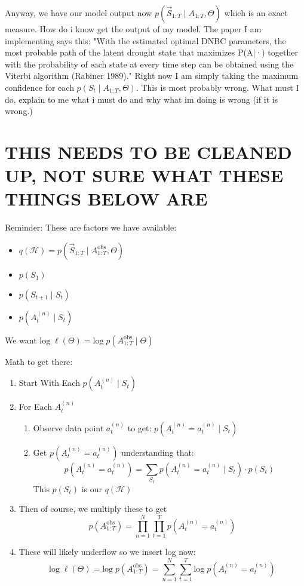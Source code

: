 Anyway, we have our model output now $p(\vec{S}_{1:T} \mid A_{1:T}, \Theta)$ which is an exact measure. How do i know get the output of my model. The paper I am implementing says this: "With the estimated optimal DNBC parameters, the most probable path of the latent drought state that maximizes P(A|·) together with the probability of each state at every time step can be obtained using the Viterbi algorithm (Rabiner 1989)." Right now I am simply taking the maximum confidence for each $p(S_t \mid A_{1:T}, \Theta)$. This is most probably wrong. What must I do, explain to me what i must do and why what im doing is wrong (if it is wrong.)








\newpage
\section{THIS NEEDS TO BE CLEANED UP, NOT SURE WHAT THESE THINGS BELOW ARE}


Reminder: These are factors we have available:
\begin{itemize}
\item $q(\mathcal{H}) = p(\vec{S}_{1:T} \mid A_{1:T}^{\text{obs}}, \Theta)$
\item $p(S_1)$
\item $p(S_{t+1} \mid S_t)$
\item $p(A^{(n)}_t \mid S_t)$
\end{itemize}

We want $\text{log} \; \ell(\Theta) = \text{log} \; p(A_{1:T}^{\text{obs}} \mid \Theta)$

Math to get there:
\begin{enumerate}
    \item Start With Each $p(A_t^{(n)} \mid S_t)$
    \item For Each $A_t^{(n)}$
        \begin{enumerate}
            \item Observe data point $a_t^{(n)}$ to get: $p(A_t^{(n)} = a^{(n)}_t \mid S_t)$
            \item Get $p(A_t^{(n)} = a^{(n)}_t)$ understanding that: 
                \[
p(A_t^{(n)} = a^{(n)}_t) = \sum\limits_{S_t} p(A_t^{(n)} = a^{(n)}_t \mid S_t) \cdot p(S_t)
                \]
                This $p(S_t)$ is our $q(\mathcal{H})$
        \end{enumerate}
    \item Then of course, we multiply these to get 
        \[
p(A_{1:T}^\text{obs}) = \prod\limits_{n=1}^N\prod\limits_{t=1}^T p(A_t^{(n)} = a^{(n)}_t)
        \]
    \item These will likely underflow so we insert log now: 
        \[
            \text{log} \; \ell(\Theta) = \text{log} \; p(A_{1:T}^\text{obs}) = \sum\limits_{n=1}^N\sum\limits_{t=1}^T \text{log} \; p(A_t^{(n)} = a^{(n)}_t)
        \]
\end{enumerate}

